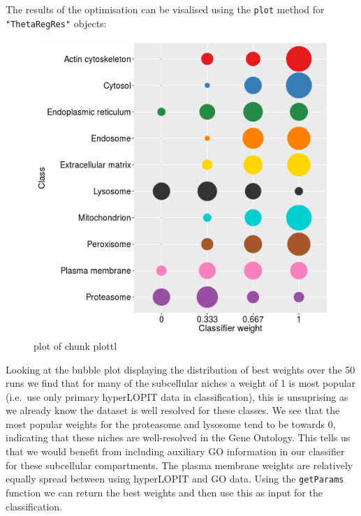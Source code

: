 The results of the optimisation can be visalised using the \texttt{plot}
method for \texttt{"ThetaRegRes"} objects:

\begin{Shaded}
\begin{Highlighting}[]
\end{Highlighting}
\end{Shaded}

\begin{figure}[htbp]
\centering
\includegraphics{figure/plottl-1.png}
\caption{plot of chunk plottl}
\end{figure}

Looking at the bubble plot displaying the distribution of best weights
over the 50 runs we find that for many of the subcellular niches a
weight of 1 is most popular (i.e.~use only primary hyperLOPIT data in
classification), this is unsuprising as we already know the dataset is
well resolved for these classes. We see that the most popular weights
for the proteasome and lysosome tend to be towards 0, indicating that
these niches are well-resolved in the Gene Ontology. This tells us that
we would benefit from including auxiliary GO information in our
classifier for these subcellular compartments. The plasma membrane
weights are relatively equally spread between using hyperLOPIT and GO
data. Using the \texttt{getParams} function we can return the best
weights and then use this as input for the classification.

